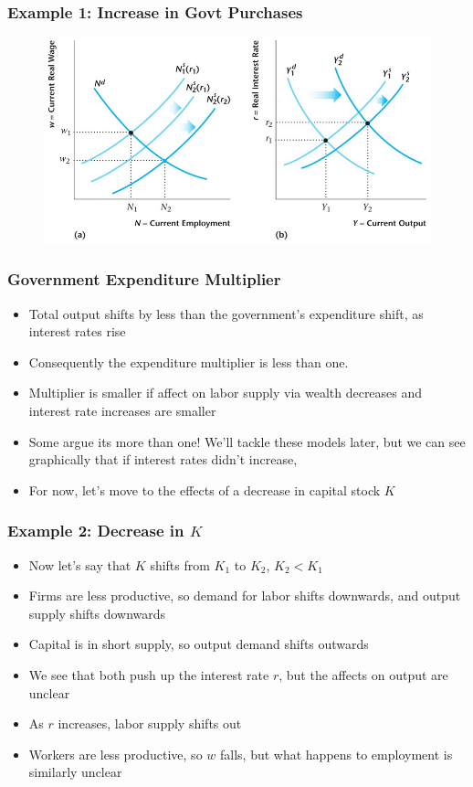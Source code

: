 \documentclass{beamer}
\begin{document}
\begin{frame}
\frametitle[alignment=center]{Example 1: Increase in Govt Purchases} 
\begin{figure}
\centering
\includegraphics[scale=0.52]{Figures/W_Fig_11pt22.png}
\end{figure}
\end{frame}

\begin{frame}
\frametitle[alignment=center]{Government Expenditure Multiplier} 
\begin{itemize}
\item Total output shifts by less than the government's expenditure shift, as interest rates rise
\bigskip
\item Consequently the expenditure multiplier is less than one.
\bigskip
\item Multiplier is smaller if affect on labor supply via wealth decreases and interest rate increases are smaller
\bigskip
\item Some argue its more than one!  We'll tackle these models later, but we can see graphically that if interest rates didn't increase, 
\bigskip
\item For now, let's move to the effects of a decrease in capital stock $K$
\end{itemize}
\end{frame}


\begin{frame}
\frametitle[alignment=center]{Example 2: Decrease in $K$} 
\begin{itemize}
\item Now let's say that $K$ shifts from $K_1$ to $K_2$, $K_2<K_1$
\bigskip
\item Firms are less productive, so demand for labor shifts downwards, and output supply shifts downwards
\bigskip
\item Capital is in short supply, so output demand shifts outwards
\bigskip
\item We see that both push up the interest rate $r$, but the affects on output are unclear
\bigskip
\item As $r$ increases, labor supply shifts out
\bigskip
\item Workers are less productive, so $w$ falls, but what happens to employment is similarly unclear
\end{itemize}
\end{frame}
\end{document}
